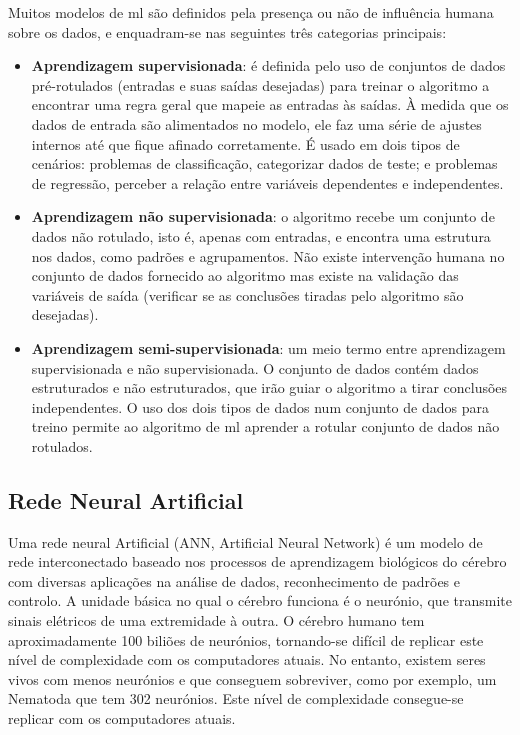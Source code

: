 Muitos modelos de \ac{ml} são definidos pela presença ou não de influência humana sobre os dados, e  enquadram-se nas seguintes três categorias principais:
\begin{itemize}
\item \textbf{Aprendizagem supervisionada}:  é definida pelo uso de conjuntos de dados pré-rotulados (entradas e suas saídas desejadas) para treinar o algoritmo a encontrar uma regra geral que mapeie as entradas às saídas. À medida que os dados de entrada são alimentados no modelo, ele faz uma série de ajustes internos até que fique afinado corretamente. É usado em dois tipos de cenários: problemas de classificação, categorizar dados de teste; e problemas de regressão, perceber a relação entre variáveis dependentes e independentes.


\item \textbf{Aprendizagem não supervisionada}: o algoritmo recebe um conjunto de dados não rotulado, isto é, apenas com entradas, e encontra uma estrutura nos dados, como padrões e agrupamentos. Não existe intervenção humana no conjunto de dados fornecido ao algoritmo mas existe na validação das variáveis de saída (verificar se as conclusões tiradas pelo algoritmo são desejadas).


\item \textbf{Aprendizagem semi-supervisionada}: um meio termo entre aprendizagem supervisionada e não supervisionada. O conjunto de dados contém  dados estruturados e não estruturados, que irão guiar o algoritmo a tirar conclusões independentes. O uso dos dois tipos de dados num conjunto de dados para treino permite ao algoritmo de \ac{ml} aprender a rotular conjunto de dados não rotulados.

\end{itemize}

\subsection{Rede Neural Artificial}

Uma rede neural Artificial (ANN, Artificial Neural Network) é um modelo de rede interconectado baseado nos processos de aprendizagem biológicos do cérebro com diversas aplicações na análise de dados, reconhecimento de padrões e controlo. 
A unidade básica no qual o cérebro funciona é o neurónio, que transmite sinais elétricos de uma extremidade à outra. O cérebro humano tem aproximadamente 100 biliões de neurónios, tornando-se difícil de replicar este nível de complexidade com os computadores atuais. No entanto, existem seres vivos com menos neurónios e que conseguem sobreviver, como por exemplo, um Nematoda que tem 302 neurónios. Este nível de complexidade consegue-se replicar com os computadores atuais.

